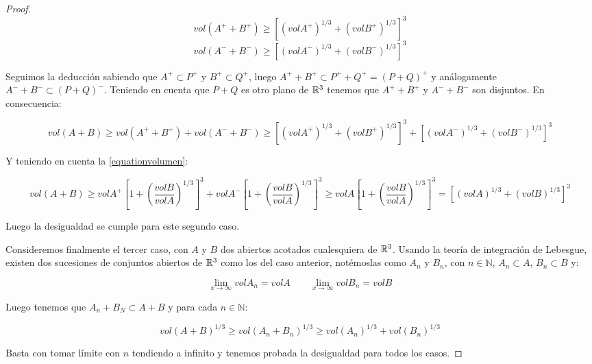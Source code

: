 \begin{proof}
\begin{equation*}
    vol (A^+ + B^+) \geq \left[ (vol A^+)^{1/3} + (vol B^+)^{1/3} \right]^3
\end{equation*}
\begin{equation*}
    vol (A^- + B^-) \geq \left[ (vol A^-)^{1/3} + (vol B^-)^{1/3} \right]^3
\end{equation*}

Seguimos la deducción sabiendo que $A^+ \subset P^+$ y $B^+ \subset Q^+$, luego $A^+ + B^+ \subset P^+ + Q^+ = (P+Q)^+$ y análogamente $A^- + B^- \subset (P+Q)^-$. Teniendo en cuenta que $P+Q$ es otro plano de $\mathbb{R}^3$ tenemos que $A^+ + B^+$ y $A^- + B^-$ son disjuntos. En consecuencia:

\begin{equation*}
    vol (A+B) \geq vol(A^+ + B^+) + vol(A^- + B^-) \geq \left[ (vol A^+)^{1/3} + (vol B^+)^{1/3} \right]^3 + \left[ (vol A^-)^{1/3} + (vol B^-)^{1/3} \right]^3
\end{equation*}

Y teniendo en cuenta la \autoref{equationvolumen}:

\begin{equation*}
    vol (A+B) \geq vol A^+ \left[ 1 + \left( \frac{vol B}{vol A} \right)^{1/3}  \right]^3 + vol A^- \left[ 1 + \left( \frac{vol B}{vol A} \right)^{1/3}  \right]^3 \geq vol A \left[ 1 + \left( \frac{vol B}{vol A} \right)^{1/3}  \right]^3 = \left[ (vol A)^{1/3} + (vol B)^{1/3} \right]^3
\end{equation*}

Luego la desigualdad se cumple para este segundo caso.

Consideremos finalmente el tercer caso, con $A$ y $B$ dos abiertos acotados cualesquiera de $\mathbb{R}^3$. Usando la teoría de integración de Lebesgue, existen dos sucesiones de conjuntos abiertos de $\mathbb{R}^3$ como los del caso anterior, notémoslas como $A_n$ y $B_n$, con $n \in \mathbb{N}$, $A_n \subset A$, $B_n \subset B$ y:

\begin{equation*}
    \lim_{x \to \infty} vol A_n = vol A \qquad \lim_{x \to \infty} vol B_n = vol B
\end{equation*}

Luego tenemos que $A_n + B_N \subset A + B$ y para cada $n \in \mathbb{N}$:

\begin{equation*}
    vol (A+B)^{1/3} \geq vol (A_n+B_n)^{1/3} \geq vol (A_n) ^{1/3} + vol(B_n)^{1/3}
\end{equation*}

Basta con tomar límite con $n$ tendiendo a infinito y tenemos probada la desigualdad para todos los casos.
\end{proof}

